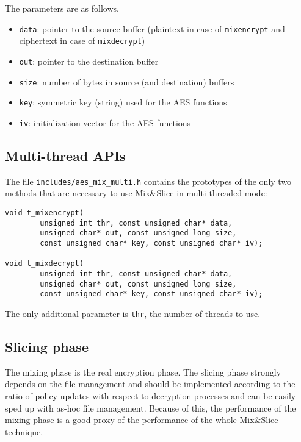 The parameters are as follows.

\begin{itemize}
\tightlist
\item
  \texttt{data}: pointer to the source buffer (plaintext in case of
  \texttt{mixencrypt} and ciphertext in case of \texttt{mixdecrypt})
\item
  \texttt{out}: pointer to the destination buffer
\item
  \texttt{size}: number of bytes in source (and destination) buffers
\item
  \texttt{key}: symmetric key (string) used for the AES functions
\item
  \texttt{iv}: initialization vector for the AES functions
\end{itemize}

\subsection{Multi-thread APIs}\label{multi-thread-apis}

The file \texttt{includes/aes\_mix\_multi.h} contains the prototypes of
the only two methods that are necessary to use Mix\&Slice in
multi-threaded mode:

\begin{verbatim}
void t_mixencrypt(
        unsigned int thr, const unsigned char* data,
        unsigned char* out, const unsigned long size,
        const unsigned char* key, const unsigned char* iv);

void t_mixdecrypt(
        unsigned int thr, const unsigned char* data,
        unsigned char* out, const unsigned long size,
        const unsigned char* key, const unsigned char* iv);
\end{verbatim}

The only additional parameter is \texttt{thr}, the number of threads to
use.

\subsection{Slicing phase}\label{slicing-phase}

The mixing phase is the real encryption phase. The slicing phase
strongly depends on the file management and should be implemented
according to the ratio of policy updates with respect to decryption
processes and can be easily sped up with as-hoc file management. Because
of this, the performance of the mixing phase is a good proxy of the
performance of the whole Mix\&Slice technique.

